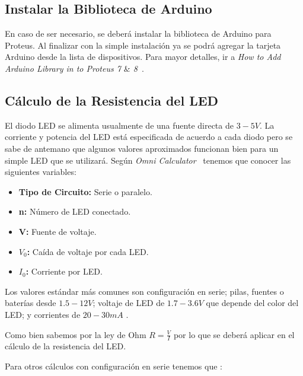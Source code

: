\documentclass{article}
\begin{document}
    \subsection{Instalar la Biblioteca de Arduino}\label{subsec:instalar-la
    -biblioteca-de-arduino}

    En caso de ser necesario, se deberá instalar la biblioteca de Arduino
    para Proteus. Al finalizar con la simple instalación ya se podrá agregar
    la tarjeta Arduino desde la lista de dispositivos. Para mayor detalles,
    ir a \textit{How to Add Arduino Library in to Proteus 7 $\&$ 8}~\cite{instructables-2018}.

    \subsection{Cálculo de la Resistencia del LED}\label{subsec:cálculo-de-la
    -resistencia-del-led}

    El diodo LED se alimenta usualmente de una fuente directa de $3-5V$. La
    corriente y potencia del LED está especificada de acuerdo a cada diodo
    pero se sabe de antemano que algunos valores aproximados funcionan bien
    para un simple LED que se utilizará. Según \textit{Omni Calculator}~\cite{szyk-2022} tenemos que conocer las siguientes variables:

    \begin{itemize}
        \item \textbf{Tipo de Circuito:} Serie o paralelo.
        \item \textbf{n:} Número de LED conectado.
        \item \textbf{V:} Fuente de voltaje.
        \item \textbf{$V_0$:} Caída de voltaje por cada LED\@.
        \item \textbf{$I_0$:} Corriente por LED\@.
    \end{itemize}

    Los valores estándar más comunes son configuración en serie; pilas,
    fuentes o baterías desde $1.5-12V$; voltaje de LED de $1.7-3.6V$ que
    depende del color del LED; y corrientes de $20-30mA$ \cite{szyk-2022}.

    \bigbreak

    Como bien sabemos por la ley de Ohm $R = \frac{V}{I}$ por lo que se
    deberá aplicar en el cálculo de la resistencia del LED\@.

    \bigbreak

    Para otros cálculos con configuración en serie tenemos que \cite{szyk-2022}:
\end{document}
